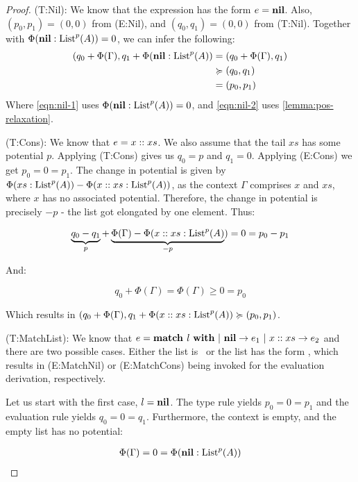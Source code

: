 \begin{proof}
   (T:Nil): We know that the expression has the form \(e = \textbf{nil}\). Also, \((p_0, p_1) = (0, 0)\) from (E:Nil), and \((q_0, q_1) = (0, 0)\) from (T:Nil). Together with \(\Phi(\textbf{nil} : \text{List}^{p}(A)) = 0\), we can infer the following:
   \begin{align}
      (q_0 + \Phi(\Gamma), q_1 + \Phi(\listnil : \ralist{p}{A})   &= (q_0 + \Phi(\Gamma), q_1)\label{eqn:nil-1} \\
                                                                  &\relaxation (q_0, q_1) \label{eqn:nil-2}\\
                                                                  &= (p_0, p_1)
   \end{align}
   Where \cref{eqn:nil-1} uses \(\Phi(\textbf{nil}: \text{List}^{p}(A)) = 0\), and \cref{eqn:nil-2} uses \cref{lemma:pos-relaxation}. 

   (T:Cons): We know that \(e = x :: xs\). We also assume that the tail \(xs\) has some potential \(p\). Applying (T:Cons) gives us \(q_0 = p\) and \(q_1 = 0\). Applying (E:Cons) we get \(p_0 = 0 = p_1\).   
   The change in potential is given by \(\Phi(xs : \text{List}^{p}(A)) - \Phi(x :: xs : \text{List}^{p}(A))\), as the context \(\Gamma\) comprises \(x\) and \(xs\), where \(x\) has no associated potential. Therefore, the change in potential is precisely \(-p\) - the list got elongated by one element. Thus:

   \[
      \underbrace{q_0 - q_1}_{p} + \underbrace{\Phi(\Gamma) - \Phi(x :: xs : \text{List}^{p}(A)}_{-p}) = 0 = p_0 - p_1
   \] 

   And:

   \[
      q_0 + \Phi(\Gamma) = \Phi(\Gamma) \geq 0 = p_0
   \]

   Which results in \((q_0 + \Phi(\Gamma), q_1 + \Phi(x :: xs : \text{List}^{p}(A)) \succcurlyeq (p_0, p_1)\). 

   (T:MatchList): We know that \(e = \textbf{match } l~\textbf{with}~|~\textbf{nil} \to e_1~|~x :: xs \to e_2\) and there are two possible cases. Either the list is \listnil ~or the list has the form , which results in (E:MatchNil) or (E:MatchCons) being invoked for the evaluation derivation, respectively. 

   Let us start with the first case, \(l = \textbf{nil}\). The type rule yields \(p_0 = 0 = p_1\) and the evaluation rule yields \(q_0 = 0 = q_1\). Furthermore, the context is empty, and the empty list has no potential:

   \begin{align*}
      \Phi(\Gamma) = 0 = \Phi(\textbf{nil} : \text{List}^{p}(A))\\
   \end{align*}


\end{proof}
